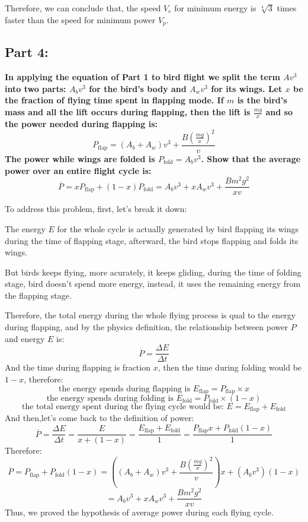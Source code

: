\documentclass{article}
\begin{document}
Therefore, we can conclude that, the speed \(V_e\) for minimum energy is \(\sqrt[4]{3}\) times faster than the speed for minimum power \(V_p\).

\subsection*{Part 4:}
\label{sec:part4}
{\large \bfseries In applying the equation of Part 1 to bird flight we split the term \(Av^3\)into two
parts: \(A_bv^3\) for the bird’s body and \(A_wv^3\) for its wings. Let \(x\) be the fraction of flying time spent in flapping mode. If \(m\) is the bird’s mass and all the lift occurs during flapping, then the lift is \(\frac{mg}{x}\) and so the power needed during flapping is:
\[P_\text{flap} = (A_b+A_w)v^3+\frac{B(\frac{mg}{x})^2}{v}\]
The power while wings are folded is \(P_\text{fold}=A_bv^3\). Show that the average power over an entire flight cycle is:
\[\overline{P}=xP_\text{flap}+(1-x)P_\text{fold} = A_bv^3+xA_wv^3+\frac{Bm^2g^2}{xv}\]}

To address this problem, first, let's break it down:

 The energy \(E\) for the whole cycle is actually generated by bird flapping its wings during the time of flapping stage, afterward, the bird stops flapping and folds its wings.

 But birds keeps flying, more acurately, it keeps gliding, during the time of folding stage, bird doesn't spend more energy, instead, it uses the remaining energy from the flapping stage.

Therefore, the total energy during the whole flying process is qual to the energy during flapping, and by the physics definition, the relationship between power \(P\) and energy \(E\) is:
\[\overline{P}=\frac{\Delta E}{\Delta t}\]
And the time during flapping is fraction \(x\), then the time during folding would be \(1-x\), therefore:
\[\text{the energy spends during flapping is } E_\text{flap} =P_\text{flap}\times  x \]
\[\text{the energy spends during folding is } E_\text{fold} = P_\text{fold}\times (1-x)\] 
\[\text{the total energy spent during the flying cycle would be: }E = E_\text{flap} +E_\text{fold} \]
And then,let's come back to the definition of power:
 \[\overline{P}=\frac{\Delta E}{\Delta t}=\frac{E}{x+(1-x)}=\frac{E_\text{flap}+E_\text{fold}}{1}=\frac{P_\text{flap}x + P_\text{fold}(1-x)}{1}\]
 Therefore:
\[\overline{P}=P_\text{flap}+P_\text{fold}(1-x)=((A_b+A_w)v^3+\frac{B(\frac{mg}{x})^2}{v})x+(A_bv^3)(1-x)\] 
\[= A_bv^3+xA_wv^3+\frac{Bm^2g^2}{xv}\]
Thus, we proved the hypothesis of average power during each flying cycle.
\end{document}
